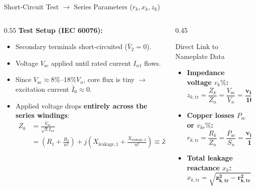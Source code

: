 
\begin{frame}{Short-Circuit Test $\to$ Series Parameters ($r_k, x_k, z_k$)}
\begin{columns}
\begin{column}{0.55\textwidth}
\small
\textbf{Test Setup (IEC 60076):}
\begin{itemize}
    \item Secondary terminals \alert{short-circuited} ($\bar{V}_2 = 0$).
    \item Voltage $V_{\text{sc}}$ applied until rated current $I_{n1}$ flows.
    \item Since $V_{\text{sc}} \approx 8\%\text{--}18\% V_n$, core flux is tiny $\to$ excitation current $\bar{I}_0 \approx 0$.
    \item Applied voltage drops \textbf{entirely across the series windings}:
    \begin{align*}
    Z_k &= \frac{V_{\text{sc}}}{\sqrt{3} I_{n1}} \\ 
    &= (R_1 + \frac{R_2}{n^2}) + j( X_{\text{leakage}, 1} + \frac{X_{\text{leakage}, 2}}{n^2} ) \equiv Z_{\text{total}}^{(p)}
    \end{align*}
\end{itemize}
\normalsize
\end{column}
\begin{column}{0.45\textwidth}
\small
\begin{block}{Direct Link to Nameplate Data}
\begin{itemize}
    \item \textbf{Impedance voltage $v_k\%$:}
    $$z_{k, \text{tr}} = \frac{Z_k}{Z_n} = \frac{V_{\text{sc}}}{V_n} = \mathbf{\frac{v_k\%}{100}}$$
    \item \textbf{Copper losses $P_{\text{sc}}$ or $v_{kr}\%$:}
    $$r_{k, \text{tr}} = \frac{R_k}{Z_n} = \frac{P_{\text{sc}}}{S_n} = \mathbf{\frac{v_{kr}\%}{100}}$$
    \item \textbf{Total leakage reactance $x_k$:}
    $$x_{k, \text{tr}} = \mathbf{\sqrt{z_{k, \text{tr}}^2 - r_{k, \text{tr}}^2}}$$
\end{itemize}
\end{block}
\normalsize
\end{column}
\end{columns}
\end{frame}

